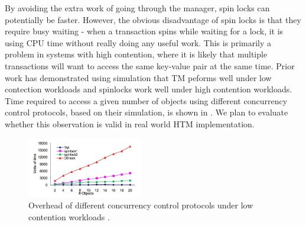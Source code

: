By avoiding the extra work of going through the manager, spin locks can
potentially be faster. However, the obvious disadvantage of spin locks is that
they require busy waiting - when a transaction spins while waiting for a lock,
it is using CPU time without really doing any useful work. This is primarily a
problem in systems with high contention, where it is likely that multiple
transactions will want to access the same key-value pair at the same time. Prior
work \citep{tran2010} has demonstrated using simulation that 
TM peforms well under low contection workloads and spinlocks work well under 
high contention workloads. Time required to access a given number of objects 
using different concurrency control protocols, based on their simulation, 
is shown in . We plan to
evaluate whether this observation is valid in real world HTM implementation.

\begin{figure}[h!]
  \centering
  \includegraphics[width=0.45\textwidth]{figure/overhead.jpg}
  \caption{Overhead of different concurrency control protocols under low
  contention workloads \citep{tran2010}.}
  \label{fig:overhead} 
\end{figure}

